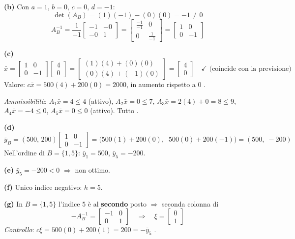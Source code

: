 \documentclass[12pt]{extarticle} %
\begin{document}
\textbf{(b)} Con $a=1,\,b=0,\,c=0,\,d=-1$:
\[
\det(A_B) = (1)(-1) - (0)(0) = -1 \ne 0
\]
\[
A_B^{-1} = \frac{1}{-1}\begin{bmatrix} -1 & -0\\ -0 & 1\end{bmatrix}
= \begin{bmatrix} \frac{-1}{-1} & 0\\ 0 & \frac{1}{-1}\end{bmatrix}
= \begin{bmatrix} 1 & 0\\ 0 & -1\end{bmatrix}
\]

\textbf{(c)}
\[
\bar{x} = \begin{bmatrix} 1 & 0\\ 0 & -1\end{bmatrix}\begin{bmatrix} 4\\ 0\end{bmatrix}
= \begin{bmatrix} (1)(4) + (0)(0)\\ (0)(4) + (-1)(0)\end{bmatrix}
= \begin{bmatrix} 4\\ 0\end{bmatrix} \quad\checkmark \text{ (coincide con la previsione)}
\]
Valore: $c\bar{x} = 500(4) + 200(0) = 2000$, in aumento rispetto a $0$ \checkmark.

\textit{Ammissibilità}: $A_1\bar{x} = 4 \le 4$ (attivo), $A_2\bar{x} = 0 \le 7$, $A_3\bar{x} = 2(4)+0 = 8 \le 9$, $A_4\bar{x} = -4 \le 0$, $A_5\bar{x} = 0 \le 0$ (attivo). Tutto \checkmark.

\textbf{(d)}
\[
\bar{y}_B = (500,\,200)\begin{bmatrix} 1 & 0\\ 0 & -1\end{bmatrix}
= \big(500(1) + 200(0),\;\; 500(0) + 200(-1)\big) = (500,\;-200)
\]
Nell'ordine di $B = \{1,5\}$: $\bar{y}_1 = 500$, $\bar{y}_5 = -200$.

\textbf{(e)} $\bar{y}_5 = -200 < 0$ $\Rightarrow$ non ottimo.

\textbf{(f)} Unico indice negativo: $h = 5$.

\textbf{(g)} In $B = \{1,5\}$ l'indice $5$ è al \textbf{secondo} posto $\Rightarrow$ seconda colonna di
\[
-A_B^{-1} = \begin{bmatrix} -1 & 0\\ 0 & 1\end{bmatrix}
\quad\Longrightarrow\quad
\xi = \begin{bmatrix} 0\\ 1\end{bmatrix}
\]
\textit{Controllo}: $c\xi = 500(0) + 200(1) = 200 = -\bar{y}_5$ \checkmark.
\end{document}
